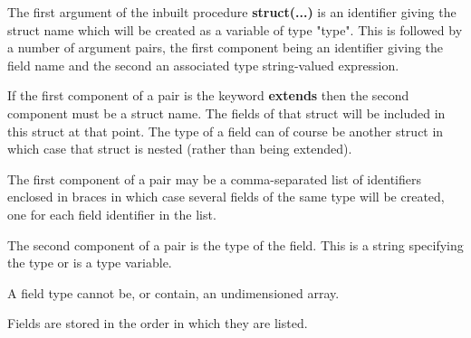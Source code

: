                 The first argument of the inbuilt procedure {\bf struct(...)}
                is an identifier giving the struct name which will be created
                as a variable of type "type". This is followed by a number of
                argument pairs, the first component being an identifier giving
                the field name and the second an associated type string-valued
                expression.
                
                If the first component of a pair is the keyword
                {\bf extends} then the second component must be a struct name.
                The fields of that struct will be included in this struct at
                that point. The type of a field can of course be another struct
                in which case that struct is nested (rather than being
                extended).
                
                The first component of a pair may be a comma-separated list
                of identifiers enclosed in braces in which case several fields
                of the same type will be created, one for each field identifier
                in the list.
                
                The second component of a pair is the type of the field. This
                is a string specifying the type or is a type variable.
                
                A field type cannot be, or contain, an undimensioned array.
                
                Fields are stored in the order in which they are listed.
                

